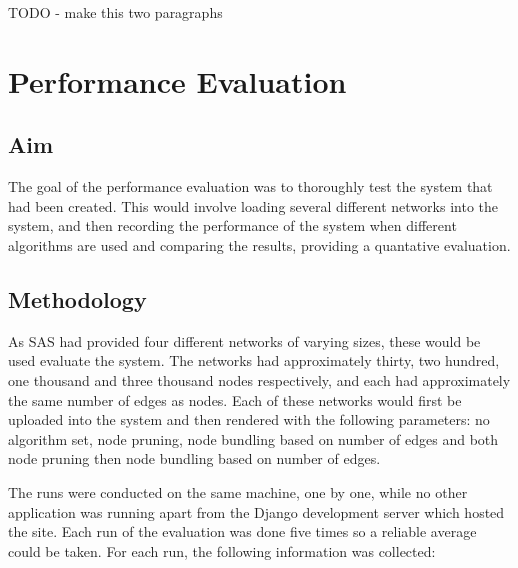 \documentclass[../dissertation.tex]{subfiles}
\begin{document}
TODO - make this two paragraphs

\section{Performance Evaluation}

\subsection{Aim}

The goal of the performance evaluation was to thoroughly test the system that had been created. This would involve loading several different networks into the system, and then recording the performance of the system when different algorithms are used and comparing the results, providing a quantative evaluation.

\subsection{Methodology}

As SAS had provided four different networks of varying sizes, these would be used evaluate the system. The networks had approximately thirty, two hundred, one thousand and three thousand nodes respectively, and each had approximately the same number of edges as nodes. Each of these networks would first be uploaded into the system and then rendered with the following parameters: no algorithm set, node pruning, node bundling based on number of edges and both node pruning then node bundling based on number of edges.

The runs were conducted on the same machine, one by one, while no other application was running apart from the Django development server which hosted the site. Each run of the evaluation was done five times so a reliable average could be taken. For each run, the following information was collected:
\end{document}

